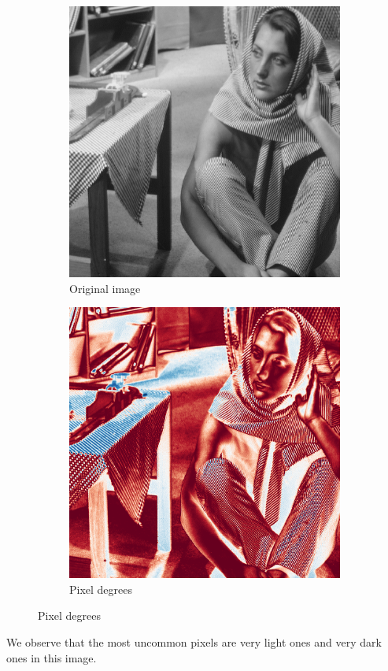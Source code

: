 \begin{figure}[H]
    \centering
    \begin{subfigure}[b]{0.45\textwidth}
        \includegraphics[width=\textwidth]{img/barbara.png}
        \caption{Original image}
    \end{subfigure}
    \begin{subfigure}[b]{0.45\textwidth}
        \includegraphics[width=\textwidth]{img/pixelDegrees.png}
        \caption{Pixel degrees}
    \end{subfigure}
\end{figure}

We observe that the most uncommon pixels are very light ones and very dark ones in this image.
